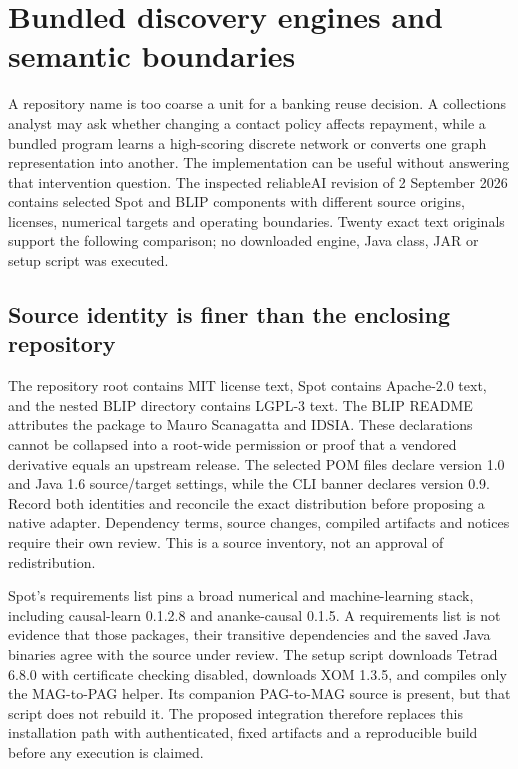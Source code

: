 \section[Bundled discovery engines and semantic boundaries]{Bundled discovery engines and semantic boundaries}
\label{sec:exec28-nested-engines}
A repository name is too coarse a unit for a banking reuse decision. A collections
analyst may ask whether changing a contact policy affects repayment, while a
bundled program learns a high-scoring discrete network or converts one graph
representation into another. The implementation can be useful without answering
that intervention question. The inspected reliableAI revision of 2 September
2026 contains selected Spot and BLIP components with different source origins,
licenses, numerical targets and operating boundaries. Twenty exact text originals
support the following comparison; no downloaded engine, Java class, JAR or setup
script was executed.\citep{exec28_nested_sources}

\subsection{Source identity is finer than the enclosing repository}
The repository root contains MIT license text, Spot contains Apache-2.0 text,
and the nested BLIP directory contains LGPL-3 text. The BLIP README attributes
the package to Mauro Scanagatta and IDSIA. These declarations cannot be collapsed
into a root-wide permission or proof that a vendored derivative equals an
upstream release. The selected POM files declare version 1.0 and Java 1.6
source/target settings, while the CLI banner declares version 0.9. Record both
identities and reconcile the exact distribution before proposing a native
adapter. Dependency terms, source changes, compiled artifacts and notices require
their own review. This is a source inventory, not an approval of redistribution.
\citep{exec28_nested_sources}

Spot's requirements list pins a broad numerical and machine-learning stack,
including causal-learn 0.1.2.8 and ananke-causal 0.1.5. A requirements list is
not evidence that those packages, their transitive dependencies and the saved
Java binaries agree with the source under review. The setup script downloads
Tetrad 6.8.0 with certificate checking disabled, downloads XOM 1.3.5, and compiles
only the MAG-to-PAG helper. Its companion PAG-to-MAG source is present, but that
script does not rebuild it. The proposed integration therefore replaces this
installation path with authenticated, fixed artifacts and a reproducible build
before any execution is claimed.\citep{exec28_nested_sources}

